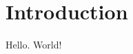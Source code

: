\documentclass[/../main.tex]{subfiles}
\begin{document}
\section{Introduction}
Hello. World!
\end{document}
